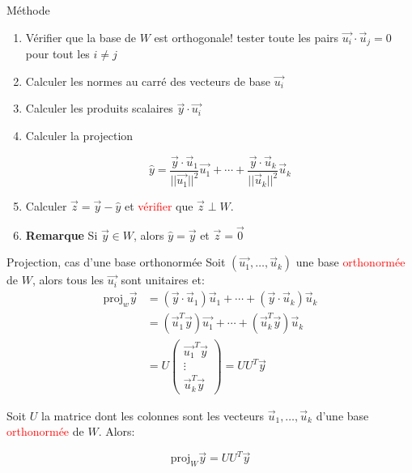 \begin{parag}{Méthode}
    \begin{enumerate}
        \item Vérifier que la base de $W$ est orthogonale! tester toute les pairs $\vec{u_i}\cdot\vec{u}_j = 0$ pour tout les $i \neq j$
        \item Calculer les normes au carré des vecteurs de base $\vec{u_i}$
        \item Calculer les produits scalaires $\vec{y}\cdot\vec{u_i}$
        \item Calculer la projection
        \begin{formule}
            \[\hat{y} = \frac{\vec{y}\cdot \vec{u}_1}{||\vec{u_1}||^2}\vec{u_1} + \cdots + \frac{\vec{y}\cdot\vec{u}_k}{||\vec{u}_k||^2}\vec{u}_k\]
        \end{formule}
        \item Calculer $\vec{z} = \vec{y}-\hat{y}$ et \textcolor{red}{vérifier} que $\vec{z}\perp W$.
        \item \textbf{Remarque} Si $\vec{y} \in W$, alors $\hat{y} = \vec{y}$ et $\vec{z} = \vec{0}$
    \end{enumerate}
\end{parag}
\begin{parag}{Projection, cas d'une base orthonormée}
    Soit $(\vec{u_1}, \dots, \vec{u}_k)$ une base \textcolor{red}{orthonormée} de $W$, alors tous les $\vec{u_i}$ sont unitaires et:
    \begin{align*}
        \text{proj}_w\vec{y} &= (\vec{y}\cdot\vec{u}_1)\vec{u}_1 + \cdots +(\vec{y}\cdot\vec{u}_k)\vec{u}_k\\
        &= (\vec{u}_1^T\vec{y})\vec{u_1} + \cdots + (\vec{u}_k^T\vec{y})\vec{u}_k\\
        &= U\begin{pmatrix}
            \vec{u_1}^T\vec{y}\\
            \vdots\\
            \vec{u}_k^T\vec{y}
        \end{pmatrix} = UU^T\vec{y}
    \end{align*}

    \begin{theoreme}
        Soit $U$ la matrice dont les colonnes sont les vecteurs $\vec{u}_1, \dots, \vec{u}_k$ d'une base \textcolor{red}{orthonormée} de $W$. Alors:

        \begin{formule}
            \[\text{proj}_W\vec{y} = UU^T\vec{y}\]
        \end{formule}
    \end{theoreme}
\end{parag}
